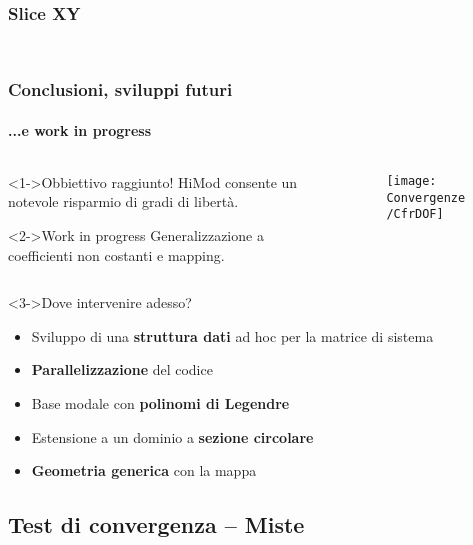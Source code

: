 \begin{frame}
\frametitle{Slice XY}
\begin{columns}

\begin{column}{0.5 \paperwidth}
\begin{figure}
\end{figure}
\end{column}

\begin{column}{0.5 \paperwidth}
\begin{figure}
\end{figure}
\end{column}

\end{columns}
\end{frame}

\begin{frame}
 \frametitle{Conclusioni, sviluppi futuri}
 \framesubtitle{...e work in progress}
 \begin{columns}
  \begin{column}{0.5\textwidth}
    \begin{exampleblock}<1->{Obbiettivo raggiunto!}
    HiMod consente un notevole risparmio di gradi di libert\`a.
    \end{exampleblock}
    \begin{alertblock}<2->{Work in progress}
    Generalizzazione a coefficienti non costanti e mapping.
    \end{alertblock}
  \end{column}

  \begin{column}{0.5\textwidth}
   \begin{figure}
   \centering
    \texttt{[image: Convergenze/CfrDOF]}
   \end{figure}
  \end{column}
 \end{columns}
 
 \begin{block}<3->{Dove intervenire adesso?}
\begin{itemize}
\footnotesize	
    \item<4-> Sviluppo di una \textbf{struttura dati} ad hoc per la matrice di sistema
    \item<5-> \textbf{Parallelizzazione} del codice
    \item<6-> Base modale con \textbf{polinomi di Legendre}
    \item<7-> Estensione a un dominio a \textbf{sezione circolare}
    \item<8-> \textbf{Geometria generica} con la mappa
   \end{itemize}
   \end{block}
\end{frame}


\subsection{Test di convergenza -- Miste}
